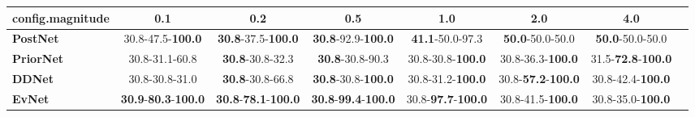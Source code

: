 \begin{tabular}{lccccccc}
\toprule
\textbf{config.magnitude} &                                         0.1 &                                         0.2 &                                         0.5 &                                1.0 &                                2.0 &                                4.0 \\
\midrule
\textbf{PostNet } &                    30.8-47.5-\textbf{100.0} &           \textbf{30.8}-37.5-\textbf{100.0} &           \textbf{30.8}-92.9-\textbf{100.0} &            \textbf{41.1}-50.0-97.3 &            \textbf{50.0}-50.0-50.0 &            \textbf{50.0}-50.0-50.0 \\
\textbf{PriorNet} &                              30.8-31.1-60.8 &                     \textbf{30.8}-30.8-32.3 &                     \textbf{30.8}-30.8-90.3 &           30.8-30.8-\textbf{100.0} &           30.8-36.3-\textbf{100.0} &  31.5-\textbf{72.8}-\textbf{100.0} \\
\textbf{DDNet   } &                              30.8-30.8-31.0 &                     \textbf{30.8}-30.8-66.8 &           \textbf{30.8}-30.8-\textbf{100.0} &           30.8-31.2-\textbf{100.0} &  30.8-\textbf{57.2}-\textbf{100.0} &           30.8-42.4-\textbf{100.0} \\
\textbf{EvNet   } &  \textbf{30.9}-\textbf{80.3}-\textbf{100.0} &  \textbf{30.8}-\textbf{78.1}-\textbf{100.0} &  \textbf{30.8}-\textbf{99.4}-\textbf{100.0} &  30.8-\textbf{97.7}-\textbf{100.0} &           30.8-41.5-\textbf{100.0} &           30.8-35.0-\textbf{100.0} \\
\bottomrule
\end{tabular}

